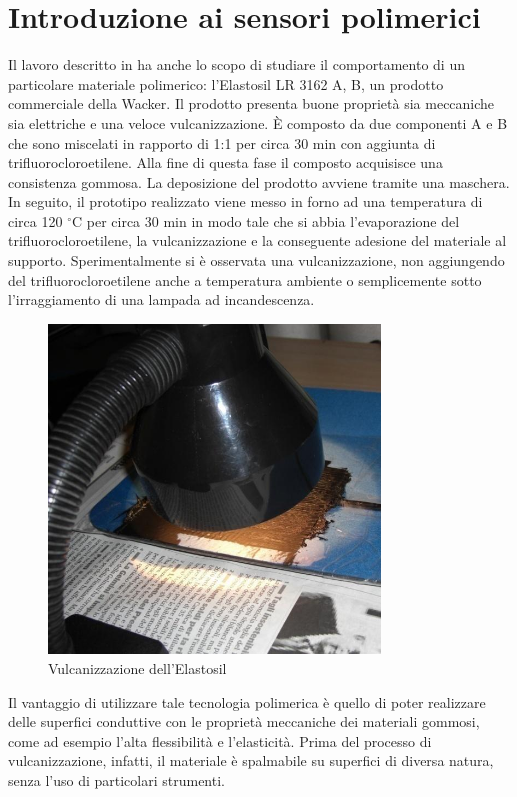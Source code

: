 \documentclass[12pt,a4paper,oneside,openright,italian]{article}
\newcommand{\degree}{\ensuremath{^\circ}}
\begin{document}
\section{Introduzione ai sensori polimerici}
Il lavoro descritto in \cite{trovato1} ha anche lo scopo di studiare il comportamento di un particolare materiale polimerico: l'Elastosil LR 3162 A, B, un prodotto commerciale della Wacker. Il prodotto presenta buone propriet\`a sia meccaniche sia elettriche e una veloce vulcanizzazione. \`E composto da due componenti A e B che sono miscelati in rapporto di 1:1 per circa 30 min con aggiunta di trifluorocloroetilene. Alla fine di questa fase il composto acquisisce una consistenza gommosa. La deposizione del prodotto avviene tramite una maschera. In seguito, il prototipo realizzato viene messo in forno ad una temperatura di circa 120 \degree C per circa 30 min in modo tale che si abbia l'evaporazione  del trifluorocloroetilene, la vulcanizzazione e la conseguente adesione del materiale al supporto. Sperimentalmente si \`e osservata una vulcanizzazione, non aggiungendo del trifluorocloroetilene anche a temperatura ambiente o semplicemente sotto l'irraggiamento di una lampada ad incandescenza.
\begin{figure}[!hbp]
  \centering
  \includegraphics[width=250pt]{immagini/lampada.jpg}
  \caption{Vulcanizzazione dell'Elastosil}
  \label{elastosil}
\end{figure}

Il vantaggio di utilizzare tale tecnologia polimerica \`e quello di poter realizzare delle superfici conduttive con le propriet\`a meccaniche dei materiali gommosi, come ad esempio l'alta flessibilit\`a e l'elasticit\`a. Prima del processo di vulcanizzazione, infatti, il materiale \`e spalmabile su superfici di diversa natura, senza l'uso di particolari strumenti.
\end{document}
